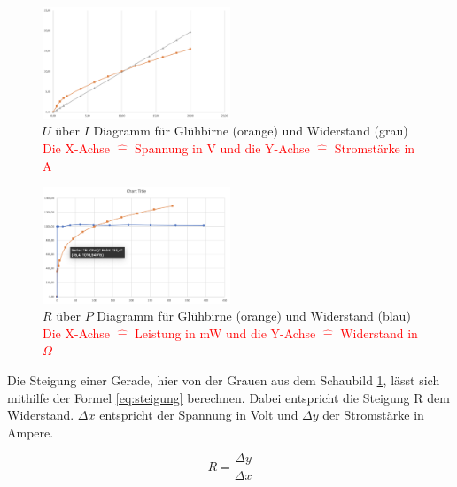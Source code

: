         \begin{figure}[ht!]
            \centering
            
            \includegraphics[width=0.5\textwidth]{bilder/Physik_02.png}
            \caption{$U$ über $I$ Diagramm für Glühbirne (orange) und Widerstand (grau) \\ \textcolor{red}{Die X-Achse $\hat{=}$ Spannung in V und die Y-Achse $\hat{=}$ Stromstärke in A}}
            \label{fig:wertev1}
        \end{figure}
\newpage
        \begin{figure}[ht!]
            \centering
            \includegraphics[width=0.5\textwidth]{bilder/Physik_03.png}
            \caption{$R$ über $P$ Diagramm für Glühbirne (orange) und Widerstand (blau) \\ \textcolor{red}{Die X-Achse $\hat{=}$ Leistung in mW und die Y-Achse $\hat{=}$ Widerstand in $\Omega$}}
            \label{fig:wertev2}
        \end{figure}

      Die Steigung einer Gerade, hier von der Grauen aus dem Schaubild \ref{fig:wertev1}, lässt sich mithilfe der Formel \ref{eq:steigung} berechnen. Dabei entspricht die Steigung R dem Widerstand. $\Delta x$ entspricht der Spannung in Volt und $\Delta y$ der Stromstärke in Ampere. 
      
     \begin{center}
     	\begin{equation}
      	\label{eq:steigung}
      	R = \frac{\Delta y}{\Delta x}
      \end{equation}
     \end{center}
     
